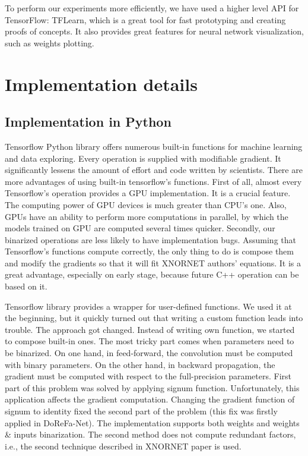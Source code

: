 \documentclass[licencjacka]{pracamgr}
\begin{document}
		To perform our experiments more efficiently, we have used a higher level API for TensorFlow: TFLearn, which is a great tool for fast prototyping and creating proofs of concepts. It also provides great features for neural network visualization, such as weights plotting.

\chapter{Implementation details}

\section{Implementation in Python}
Tensorflow Python library offers numerous built-in functions for machine learning and data exploring. Every operation is supplied with modifiable gradient. It significantly lessens the amount of effort and code written by  scientists. There are more advantages of using built-in tensorflow's functions. First of all, almost every Tensorflow’s operation provides a GPU implementation. It is a crucial feature. The computing power of GPU devices is much greater than CPU's one. Also, GPUs have an ability to perform more computations in parallel, by which the models trained on GPU are computed several times quicker. Secondly, our binarized operations are less likely to have implementation bugs. Assuming that Tensorflow’s functions compute correctly, the only thing to do is compose them and modify the gradients so that it will fit XNORNET authors' equations. It is a great advantage, especially on early stage, because future C++ operation can be based on it.
		 
Tensorflow library provides a wrapper for user-defined functions. We used it at the beginning, but it quickly turned out that writing a custom function leads into trouble. The approach got changed. Instead of writing own function, we started to compose built-in ones. The most tricky part comes when parameters need to be binarized. On one hand, in feed-forward, the convolution must be computed with binary parameters. On the other hand, in backward propagation, the gradient must be computed with respect to the full-precision parameters. First part of this problem was solved by applying signum function. Unfortunately, this application affects the gradient computation. Changing the gradient function of signum to identity fixed the second part of the problem (this fix was firstly applied in DoReFa-Net). The implementation supports both weights and weights \& inputs binarization. The second method does not compute redundant factors, i.e., the second technique described in XNORNET paper \cite{xnornet} is used.
\end{document}
